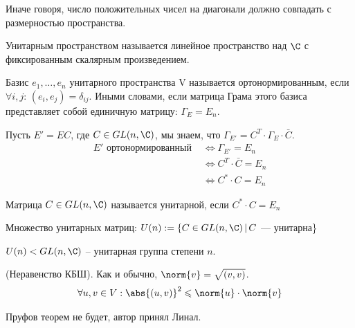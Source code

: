 Иначе говоря, число положительных чисел на диагонали должно совпадать с размерностью пространства. 

\begin{conj}
    Унитарным пространством называется линейное пространство над $\C$ с фиксированным скалярным произведением.
\end{conj}

\begin{conj}
    Базис $e_1, \dots, e_n$ унитарного пространства V называется ортонормированным,
    если $\forall i, j: \, (e_i, e_j) = \delta_{ij}$. Иными словами, если матрица Грама этого базиса представляет собой единичную матрицу: 
    $\Gamma_E = E_n$. 
\end{conj}

Пусть $E' = EC$, где $C \in GL(n, \C)$, мы знаем, что $\Gamma_{E'} = C^T \cdot \Gamma_E \cdot \bar{C}$. 
\begin{align*}
    E' \text{ ортонормированный } &\Longleftrightarrow \Gamma_{E'} = E_n \\
    &\Longleftrightarrow C^T \cdot \bar{C} = E_n \\
    &\Longleftrightarrow C^* \cdot C = E_n
\end{align*}

\begin{conj}
    Матрица $C \in GL(n, \C)$ называется унитарной, если $C^* \cdot C = E_n$
\end{conj}

\begin{conj}
    Множество унитарных матриц: $U(n) := \{ C \in GL(n, \C) \, | \, C$ --- унитарна\}
\end{conj}

\begin{theorem}
    $U(n) < GL(n, \C)$ -- унитарная группа степени $n$.
\end{theorem}

\begin{theorem} (Неравенство КБШ). Как и обычно, $\norm{v} = \sqrt{(v, v)}$. 
    \begin{gather*}
        \forall u,v \in V: \abs{(u, v)}^2 \leqslant \norm{u} \cdot \norm{v}
    \end{gather*}
\end{theorem}
Пруфов теорем не будет, автор принял Линал. 